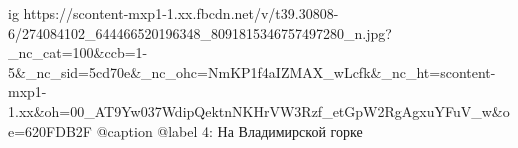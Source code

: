 
 
 
 
 

\ifcmt
  ig https://scontent-mxp1-1.xx.fbcdn.net/v/t39.30808-6/274084102_644466520196348_8091815346757497280_n.jpg?_nc_cat=100&ccb=1-5&_nc_sid=5cd70e&_nc_ohc=NmKP1f4aIZMAX_wLcfk&_nc_ht=scontent-mxp1-1.xx&oh=00_AT9Yw037WdipQektnNKHrVW3Rzf_etGpW2RgAgxuYFuV_w&oe=620FDB2F
  @caption @label 4: На Владимирской горке
\fi
